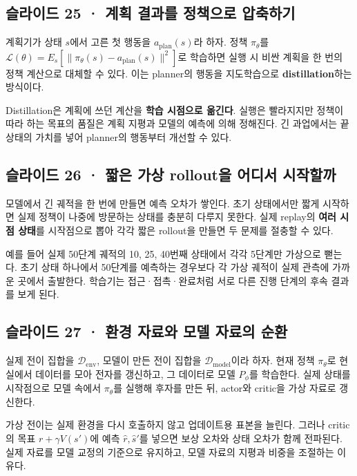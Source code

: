 \documentclass[11pt,a4paper]{article}
\begin{document}
\subsection{슬라이드 25 · 계획 결과를 정책으로 압축하기}

계획기가 상태 $s$에서 고른 첫 행동을 $a_{\mathrm{plan}}(s)$라 하자. 정책 $\pi_\theta$를 $\mathcal L(\theta)=E_s[\|\pi_\theta(s)-a_{\mathrm{plan}}(s)\|^2]$로 학습하면 실행 시 비싼 계획을 한 번의 정책 계산으로 대체할 수 있다. 이는 planner의 행동을 지도학습으로 \textbf{distillation}하는 방식이다.\par

Distillation은 계획에 쓰던 계산을 \textbf{학습 시점으로 옮긴다}. 실행은 빨라지지만 정책이 따라 하는 목표의 품질은 계획 지평과 모델의 예측에 의해 정해진다. 긴 과업에서는 끝 상태의 가치를 넣어 planner의 행동부터 개선할 수 있다.\par

\subsection{슬라이드 26 · 짧은 가상 rollout을 어디서 시작할까}

모델에서 긴 궤적을 한 번에 만들면 예측 오차가 쌓인다. 초기 상태에서만 짧게 시작하면 실제 정책이 나중에 방문하는 상태를 충분히 다루지 못한다. 실제 replay의 \textbf{여러 시점 상태}를 시작점으로 뽑아 각각 짧은 rollout을 만들면 두 문제를 절충할 수 있다.\par

예를 들어 실제 50단계 궤적의 10, 25, 40번째 상태에서 각각 5단계만 가상으로 뻗는다. 초기 상태 하나에서 50단계를 예측하는 경우보다 각 가상 궤적이 실제 관측에 가까운 곳에서 출발한다. 학습기는 접근·접촉·완료처럼 서로 다른 진행 단계의 후속 결과를 보게 된다.\par

\subsection{슬라이드 27 · 환경 자료와 모델 자료의 순환}

실제 전이 집합을 $\mathcal D_{\mathrm{env}}$, 모델이 만든 전이 집합을 $\mathcal D_{\mathrm{model}}$이라 하자. 현재 정책 $\pi_\theta$로 현실에서 데이터를 모아 전자를 갱신하고, 그 데이터로 모델 $P_\phi$를 학습한다. 실제 상태를 시작점으로 모델 속에서 $\pi_\theta$를 실행해 후자를 만든 뒤, actor와 critic을 가상 자료로 갱신한다.\par

가상 전이는 실제 환경을 다시 호출하지 않고 업데이트용 표본을 늘린다. 그러나 critic의 목표 $r+\gamma V(s')$에 예측 $\hat r,\hat s'$를 넣으면 보상 오차와 상태 오차가 함께 전파된다. 실제 자료를 모델 교정의 기준으로 유지하고, 모델 자료의 지평과 비중을 조절하는 이유다.\par
\end{document}
